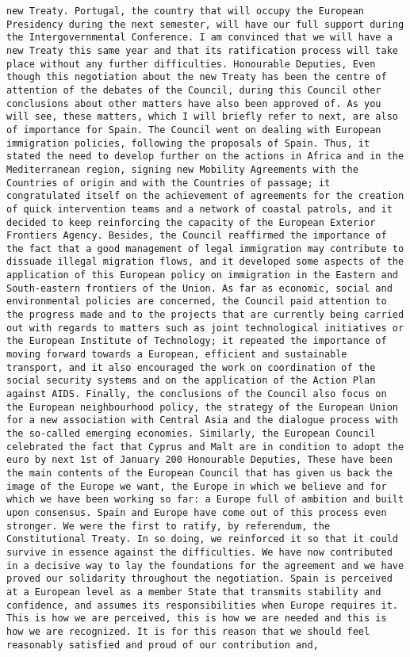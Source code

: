 \documentclass[
]{article}
\begin{document}
\begin{verbatim}
new Treaty. Portugal, the country that will occupy the European Presidency during the next semester, will have our full support during the Intergovernmental Conference. I am convinced that we will have a new Treaty this same year and that its ratification process will take place without any further difficulties. Honourable Deputies, Even though this negotiation about the new Treaty has been the centre of attention of the debates of the Council, during this Council other conclusions about other matters have also been approved of. As you will see, these matters, which I will briefly refer to next, are also of importance for Spain. The Council went on dealing with European immigration policies, following the proposals of Spain. Thus, it stated the need to develop further on the actions in Africa and in the Mediterranean region, signing new Mobility Agreements with the Countries of origin and with the Countries of passage; it congratulated itself on the achievement of agreements for the creation of quick intervention teams and a network of coastal patrols, and it decided to keep reinforcing the capacity of the European Exterior Frontiers Agency. Besides, the Council reaffirmed the importance of the fact that a good management of legal immigration may contribute to dissuade illegal migration flows, and it developed some aspects of the application of this European policy on immigration in the Eastern and South-eastern frontiers of the Union. As far as economic, social and environmental policies are concerned, the Council paid attention to the progress made and to the projects that are currently being carried out with regards to matters such as joint technological initiatives or the European Institute of Technology; it repeated the importance of moving forward towards a European, efficient and sustainable transport, and it also encouraged the work on coordination of the social security systems and on the application of the Action Plan against AIDS. Finally, the conclusions of the Council also focus on the European neighbourhood policy, the strategy of the European Union for a new association with Central Asia and the dialogue process with the so-called emerging economies. Similarly, the European Council celebrated the fact that Cyprus and Malt are in condition to adopt the euro by next 1st of January 200 Honourable Deputies, These have been the main contents of the European Council that has given us back the image of the Europe we want, the Europe in which we believe and for which we have been working so far: a Europe full of ambition and built upon consensus. Spain and Europe have come out of this process even stronger. We were the first to ratify, by referendum, the Constitutional Treaty. In so doing, we reinforced it so that it could survive in essence against the difficulties. We have now contributed in a decisive way to lay the foundations for the agreement and we have proved our solidarity throughout the negotiation. Spain is perceived at a European level as a member State that transmits stability and confidence, and assumes its responsibilities when Europe requires it. This is how we are perceived, this is how we are needed and this is how we are recognized. It is for this reason that we should feel reasonably satisfied and proud of our contribution and, 
\end{verbatim}
\end{document}
